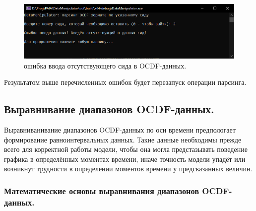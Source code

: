 {  \begin{figure}[H]
    \centering
    \includegraphics[width=\textwidth]{images/forDataManipulator/OCDFdataParsErrNotCID.png}
    \caption{ошибка ввода отсутствующего сида в OCDF-данных.} 
    \label{fig:OCDFdataParsErrnotcid}
  \end{figure}

  \par Результатом выше перечисленных ошибок будет перезапуск операции парсинга. 

}

\subsection{ \standartTitleFont
  Выравнивание диапазонов OCDF-данных.
}

{\standartFont

  \par Выравниванивание диапазонов OCDF-данных по оси времени предпологает формирование равноинтервальных данных. Такие данные необходимы прежде всего для корректной работы модели, чтобы она могла предстазывать поведение графика в определённых моментах времени, иначе точность модели упадёт или возникнут трудности в определении моментов времени у предсказанных величин. 

  \par 
}

\subsubsection{ \standartTitleFont
  Математические основы выравнивания диапазонов OCDF-данных.
}


